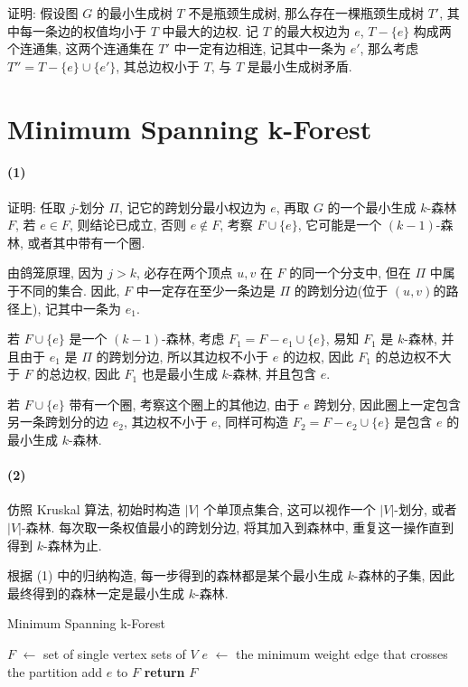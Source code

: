\documentclass{ctexart}
\newcommand{\Let}[1]{\State #1 $\gets$}
\newcommand{\Ret}[1]{\State \textbf{return} #1}
\begin{document}
证明: 假设图 $G$ 的最小生成树 $T$ 不是瓶颈生成树, 那么存在一棵瓶颈生成树 $T'$, 其中每一条边的权值均小于 $T$ 中最大的边权. 记 $T$ 的最大权边为 $e$, $T-\{e\}$ 构成两个连通集, 这两个连通集在 $T'$ 中一定有边相连, 记其中一条为 $e'$, 那么考虑 $T''=T-\{e\}\cup\{e'\}$, 其总边权小于 $T$, 与 $T$ 是最小生成树矛盾.

\section{Minimum Spanning k-Forest}

\paragraph*{(1)} 证明: 任取 $j$-划分 $\Pi$, 记它的跨划分最小权边为 $e$, 再取 $G$ 的一个最小生成 $k$-森林 $F$, 若 $e\in F$, 则结论已成立, 否则 $e\notin F$, 考察 $F\cup \{e\}$, 它可能是一个 $(k-1)$-森林, 或者其中带有一个圈.

由鸽笼原理, 因为 $j>k$, 必存在两个顶点 $u, v$ 在 $F$ 的同一个分支中, 但在 $\Pi$ 中属于不同的集合. 因此, $F$ 中一定存在至少一条边是 $\Pi$ 的跨划分边(位于 $(u, v)$的路径上), 记其中一条为 $e_1$.

若 $F\cup \{e\}$ 是一个 $(k-1)$-森林, 考虑 $F_1=F-e_1\cup\{e\}$, 易知 $F_1$ 是 $k$-森林, 并且由于 $e_1$ 是 $\Pi$ 的跨划分边, 所以其边权不小于 $e$ 的边权, 因此 $F_1$ 的总边权不大于 $F$ 的总边权, 因此 $F_1$ 也是最小生成 $k$-森林, 并且包含 $e$.

若 $F\cup \{e\}$ 带有一个圈, 考察这个圈上的其他边, 由于 $e$ 跨划分, 因此圈上一定包含另一条跨划分的边 $e_2$, 其边权不小于 $e$, 同样可构造 $F_2=F-e_2\cup\{e\}$ 是包含 $e$ 的最小生成 $k$-森林.

\paragraph*{(2)} 仿照 Kruskal 算法, 初始时构造 $|V|$ 个单顶点集合, 这可以视作一个 $|V|$-划分, 或者 $|V|$-森林. 每次取一条权值最小的跨划分边, 将其加入到森林中, 重复这一操作直到得到 $k$-森林为止.

根据 (1) 中的归纳构造, 每一步得到的森林都是某个最小生成 $k$-森林的子集, 因此最终得到的森林一定是最小生成 $k$-森林.

\begin{algorithm}[H]
    \caption{Minimum Spanning k-Forest}
    \begin{algorithmic}
        \Let{$F$} set of single vertex sets of $V$
            \Let{$e$} the minimum weight edge that crosses the partition
            \State add $e$ to $F$
        \EndFor
        \Ret{$F$}
        \EndFunction
    \end{algorithmic}
\end{algorithm}
\end{document}
